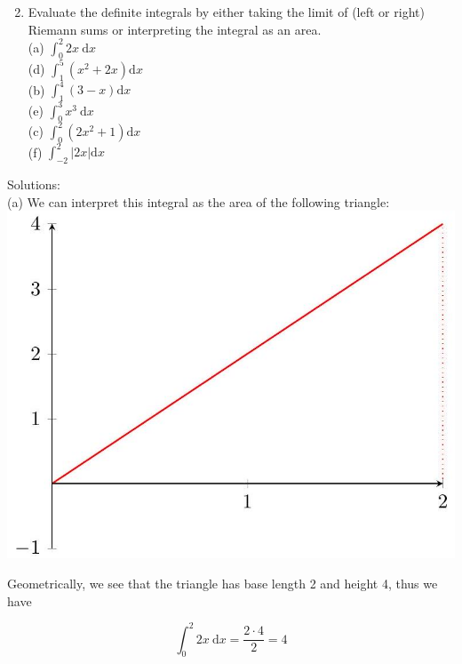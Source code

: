 \documentclass[10pt]{article}
\begin{document}
\begin{enumerate}
  \setcounter{enumi}{1}
  \item Evaluate the definite integrals by either taking the limit of (left or right) Riemann sums or interpreting the integral as an area.\\
(a) $\int_{0}^{2} 2 x \mathrm{~d} x$\\
(d) $\int_{1}^{5}\left(x^{2}+2 x\right) \mathrm{d} x$\\
(b) $\int_{1}^{4}(3-x) \mathrm{d} x$\\
(e) $\int_{0}^{3} x^{3} \mathrm{~d} x$\\
(c) $\int_{0}^{2}\left(2 x^{2}+1\right) \mathrm{d} x$\\
(f) $\int_{-2}^{2}|2 x| \mathrm{d} x$
\end{enumerate}

Solutions:\\
(a) We can interpret this integral as the area of the following triangle:\\
\includegraphics[max width=\textwidth, center]{2024_12_27_c77fac7b45ac922a81d8g-04}

Geometrically, we see that the triangle has base length 2 and height 4, thus we have

$$
\int_{0}^{2} 2 x \mathrm{~d} x=\frac{2 \cdot 4}{2}=4
$$
\end{document}
